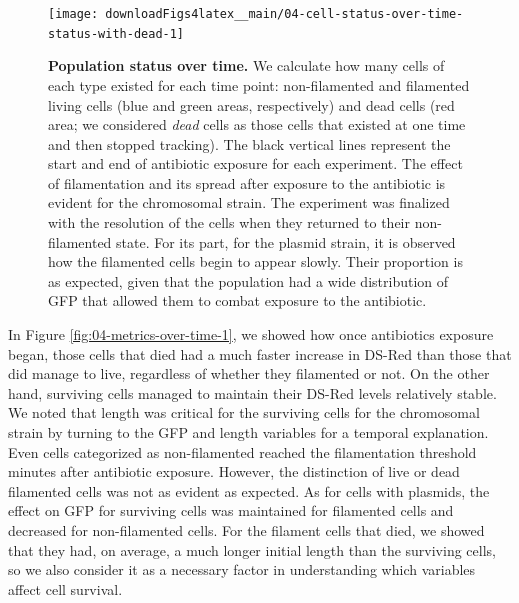 \documentclass[a4paper, nobind]{templates/ociamthesis}
\begin{document}
\begin{figure}[H]
\texttt{[image: downloadFigs4latex\_\_main/04-cell-status-over-time-status-with-dead-1]} \caption[Population status over time.]{\textbf{Population status over time.} We calculate how many cells of each type existed for each time point: non-filamented and filamented living cells (blue and green areas, respectively) and dead cells (red area; we considered \emph{dead} cells as those cells that existed at one time and then stopped tracking). The black vertical lines represent the start and end of antibiotic exposure for each experiment. The effect of filamentation and its spread after exposure to the antibiotic is evident for the chromosomal strain. The experiment was finalized with the resolution of the cells when they returned to their non-filamented state. For its part, for the plasmid strain, it is observed how the filamented cells begin to appear slowly. Their proportion is as expected, given that the population had a wide distribution of GFP that allowed them to combat exposure to the antibiotic.}\label{fig:04-cell-status-over-time-status-with-dead-1}
\end{figure}

In Figure \ref{fig:04-metrics-over-time-1}, we showed how once antibiotics exposure began, those cells that died had a much faster increase in DS-Red than those that did manage to live, regardless of whether they filamented or not.
On the other hand, surviving cells managed to maintain their DS-Red levels relatively stable.
We noted that length was critical for the surviving cells for the chromosomal strain by turning to the GFP and length variables for a temporal explanation.
Even cells categorized as non-filamented reached the filamentation threshold minutes after antibiotic exposure.
However, the distinction of live or dead filamented cells was not as evident as expected.
As for cells with plasmids, the effect on GFP for surviving cells was maintained for filamented cells and decreased for non-filamented cells.
For the filament cells that died, we showed that they had, on average, a much longer initial length than the surviving cells, so we also consider it as a necessary factor in understanding which variables affect cell survival.
\end{document}
